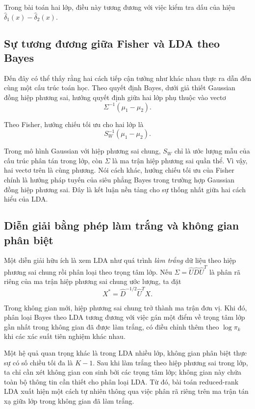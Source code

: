 Trong bài toán hai lớp, điều này tương đương với việc kiểm tra dấu của hiệu $\hat\delta_1(x)-\hat\delta_2(x)$.

\subsection{Sự tương đương giữa Fisher và LDA theo Bayes}

Đến đây có thể thấy rằng hai cách tiếp cận tưởng như khác nhau thực ra dẫn đến cùng một cấu trúc toán học. Theo quyết định Bayes, dưới giả thiết Gaussian đồng hiệp phương sai, hướng quyết định giữa hai lớp phụ thuộc vào vectơ
\begin{equation}
\Sigma^{-1}(\mu_1-\mu_2).
\end{equation}

Theo Fisher, hướng chiếu tối ưu cho hai lớp là
\begin{equation}
S_W^{-1}(\mu_1-\mu_2).
\end{equation}

Trong mô hình Gaussian với hiệp phương sai chung, $S_W$ chỉ là ước lượng mẫu của cấu trúc phân tán trong lớp, còn $\Sigma$ là ma trận hiệp phương sai quần thể. Vì vậy, hai vectơ trên là cùng phương. Nói cách khác, hướng chiếu tối ưu của Fisher chính là hướng pháp tuyến của siêu phẳng Bayes trong trường hợp Gaussian đồng hiệp phương sai. Đây là kết luận nền tảng cho sự thống nhất giữa hai cách hiểu của LDA.

\subsection{Diễn giải bằng phép làm trắng và không gian phân biệt}

Một diễn giải hữu ích là xem LDA như quá trình \emph{làm trắng} dữ liệu theo hiệp phương sai chung rồi phân loại theo trọng tâm lớp. Nếu $\Sigma=\hat U\hat D\hat U^T$ là phân rã riêng của ma trận hiệp phương sai chung ước lượng, ta đặt
\begin{equation}
X^*=\hat D^{-1/2}\hat U^T X.
\end{equation}

Trong không gian mới, hiệp phương sai chung trở thành ma trận đơn vị. Khi đó, phân loại Bayes theo LDA tương đương với việc gán một điểm về trọng tâm lớp gần nhất trong không gian đã được làm trắng, có điều chỉnh thêm theo $\log \pi_k$ khi các xác suất tiên nghiệm khác nhau.

Một hệ quả quan trọng khác là trong LDA nhiều lớp, không gian phân biệt thực sự có số chiều tối đa là $K-1$. Sau khi làm trắng theo hiệp phương sai trong lớp, ta chỉ cần xét không gian con sinh bởi các trọng tâm lớp; không gian này chứa toàn bộ thông tin cần thiết cho phân loại LDA. Từ đó, bài toán reduced-rank LDA xuất hiện một cách tự nhiên thông qua việc phân rã riêng trên ma trận tán xạ giữa lớp trong không gian đã làm trắng.

